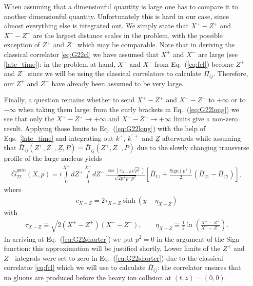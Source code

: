 \documentclass[onecolumn,showpacs,nobibnotes,nofootinbib,12pt,aps,prd,showpacs,notitlepage,nofootinbib,preprintnumbers,amsmath,amssymb]{article}
\def\eq#1{{Eq.~(\ref{#1})}}
\newcommand{\un}[1]{\underline{#1}}
\begin{document}
When assuming that a dimensionful quantity is large one has to compare
it to another dimensionful quantity. Unfortunately this is hard in our
case, since almost everything else is integrated out. We simply state
that $X^+ - Z^+$ and $X^- - Z^-$ are the largest distance scales in
the problem, with the possible exception of $Z^+$ and $Z^-$ which may
be comparable. Note that in deriving the classical correlator
\eqref{eq:G22cl} we have assumed that $X^+$ and $X^-$ are large (see
\eqref{late_time}): in the problem at hand, $X^+$ and $X^-$ from
\eq{eq:fcl} become $Z^+$ and $Z^-$ since we will be using the
classical correlators to calculate $\bar\Pi_{ij}$. Therefore, our
$Z^+$ and $Z^-$ have already been assumed to be very large.

Finally, a question remains whether to send $X^+ - Z^+$ and $X^- -
Z^-$ to $+\infty$ or to $-\infty$ when taking them large: from the
curly brackets in \eq{eq:G22long} we see that only the $X^+ - Z^+ \to
+\infty $ and $X^- - Z^- \to + \infty$ limits give a non-zero
result. Applying those limits to \eq{eq:G22long} with the help of
Eqs.~\eqref{late_time} and integrating out $k^+$, $k^{\prime \, +}$
and $\un{Z}$ afterwards while assuming that $\bar\Pi_{ij}(Z^+, Z^-,
\un{Z},P) = \bar\Pi_{ij}(Z^+, Z^-,P)$ due to the slowly changing
transverse profile of the large nucleus yields
\begin{align}\label{eq:G22shorter}
  \bar G_{22}^{gain}(X,p)=i\int\limits_0^{X^+} dZ^+
  \int\limits_0^{X^-} dZ^- \,
  \frac{\cos(c_{X-Z}\sqrt{p^2})}{\sqrt{2p^+p^-
      p^2}}\left[\bar\Pi_{11}+\frac{\mbox{Sign}
      (p^+)}{2}(\bar\Pi_{21}-\bar\Pi_{12})\right],
\end{align}
where
\begin{align}
  c_{X-Z}=2 \tau_{X-Z}\sinh(y-\eta_{X-Z})
\end{align}
with
\begin{align}
  \tau_{X-Z}\equiv\sqrt{2(X^+-Z^+)(X^--Z^-)},\qquad \eta_{X-Z}\equiv
  \frac{1}{2}\ln\left(\frac{X^+-Z^+}{X^--Z^-}\right).
\end{align}
In arriving at \eq{eq:G22shorter} we put $p^2=0$ in the argument of
the Sign-function: this approximation will be justified shortly. Lower
limits of the $Z^+$ and $Z^-$ integrals were set to zero in
\eq{eq:G22shorter} due to the classical correlator \eqref{eq:fcl}
which we will use to calculate $\bar\Pi_{ij}$: the correlator ensures
that no gluons are produced before the heavy ion collision at $(t,z) =
(0,0)$.
\end{document}
